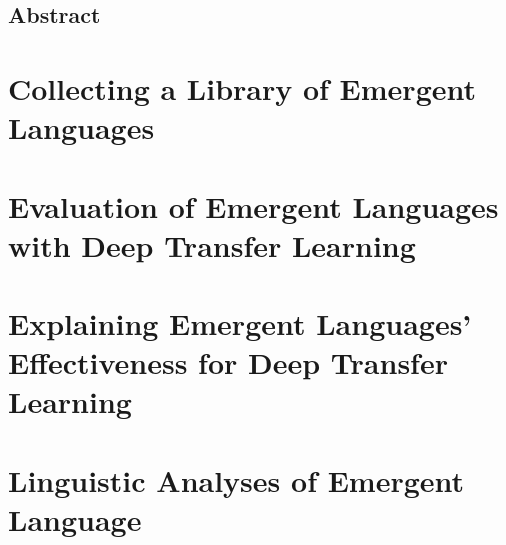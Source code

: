 





\newpage
\thispagestyle{plain}
\section*{Abstract}

\newpage
\tableofcontents*



\chapter{Collecting a Library of Emergent Languages}


\chapter{Evaluation of Emergent Languages with Deep Transfer Learning}



\chapter{Explaining Emergent Languages' Effectiveness for Deep Transfer Learning }
\unskip\label{ch:xferbench-analysis}


\chapter{Linguistic Analyses of Emergent Language}



